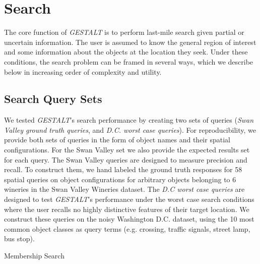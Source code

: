 \section{Search}
\label{section:search}

The core function of \textit{GESTALT} is to perform last-mile search given partial or uncertain information.
The user is assumed to know the general region of interest and some information about the objects at the location they seek.
Under these conditions, the search problem can be framed in several ways, which we describe below in increasing order of complexity and utility.

\subsection{Search Query Sets}
We tested \emph{GESTALT}'s search performance by creating two sets of queries (\textit{Swan Valley ground truth queries}, and \textit{D.C. worst case queries}). 
For reproducibility, we provide both sets of queries in the form of object names and their spatial configurations. 
For the Swan Valley set we also provide the expected results set for each query. 
The Swan Valley queries are designed to measure precision and recall. 
To construct them, we hand labeled the ground truth responses for 58 spatial queries on object configurations for arbitrary objects belonging to 6 wineries in the Swan Valley Wineries dataset. 
The \textit{D.C worst case queries} are designed to test \emph{GESTALT}'s performance under the worst case search conditions where the user recalls no highly distinctive features of their target location.
We construct these queries on the noisy Washington D.C. dataset, using the 10 most common object classes as query terms (e.g. crossing, traffic signals, street lamp, bus stop).

\begin{algorithm}
    \caption{Membership Search}\label{alg:search}
    \begin{algorithmic}
        \State{- - - - -}
            \EndFor
            \EndProcedure
    \end{algorithmic}
\end{algorithm}

